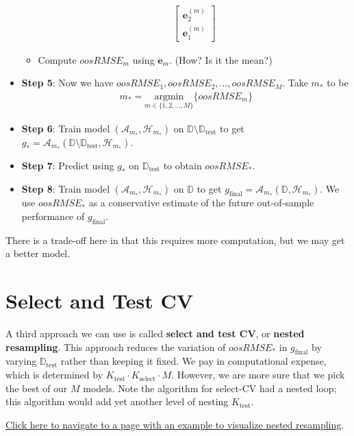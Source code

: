 \documentclass[12pt, a4paper]{article}
\theoremstyle{definition}
\newcommand{\test}{\text{test}}
\newcommand{\select}{\text{select}}
\newcommand{\Dtest}{\mathbb{D}_{\test}}
\begin{document}
\begin{itemize}
\begin{itemize}
\begin{align*}
\begin{bmatrix}
						\bm{e}_{2}^{(m)}\\
						\bm{e}_{1}^{(m)}
					\end{bmatrix}
			\end{align*}
			\item Compute $oosRMSE_m$ using $\bm{e}_m$. (How? Is it the mean?)
		\end{itemize}
		\item \textbf{Step 5}: Now we have $oosRMSE_1,oosRMSE_2,\ldots,oosRMSE_M$. Take $m_*$ to be
		\begin{align*}
			m_* = \underset{m\in\{1,2,\ldots,M\}}{\text{argmin}}
			\{
			oosRMSE_m
			\}
		\end{align*}
		\item \textbf{Step 6}: Train model $(\mathcal{A}_{m_*}, \mathcal{H}_{m_*})$
		on $\mathbb{D}\setminus \Dtest$ to get
		$g_* = \mathcal{A}_{m_*}(\mathbb{D}\setminus \Dtest, \mathcal{H}_{m_*})$.
		\item \textbf{Step 7}: Predict using $g_{*}$ on $\Dtest$ to obtain
		$oosRMSE_*$.
		\item \textbf{Step 8}: Train model $(\mathcal{A}_{m_*}, \mathcal{H}_{m_*})$
		on $\mathbb{D}$ to get $g_{\text{final}} = \mathcal{A}_{m_*} (\mathbb{D}, \mathcal{H}_{m_*})$. We use $oosRMSE_{*}$ as a conservative estimate of the
		future out-of-sample performance of $g_{\text{final}}$.
	\end{itemize}
	There is a trade-off here in that this requires more computation, but we may get
	a better model.
	\section*{Select and Test CV}
	A third approach we can use is called \textbf{select and test CV}, or
	\textbf{nested resampling}. This approach reduces the variation of $oosRMSE_*$
	in $g_{\text{final}}$ by varying $\Dtest$ rather than keeping it fixed.
	We pay in computational expense, which is determined by $K_\test\cdot K_\select\cdot M$.
	However, we are more sure that we pick the best of our $M$ models.
	Note the algorithm for select-CV had a nested loop; this algorithm would
	add yet another level of nesting $K_\test$.
	
	\href{
		https://mlr.mlr-org.com/articles/tutorial/nested_resampling.html}{Click here to navigate to a page with an example to visualize nested resampling}.
\end{document}
